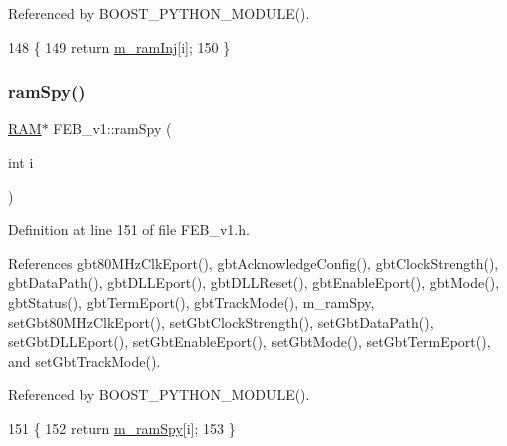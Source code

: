 Referenced by B\+O\+O\+S\+T\+\_\+\+P\+Y\+T\+H\+O\+N\+\_\+\+M\+O\+D\+U\+L\+E().


\begin{DoxyCode}
148                      \{
149     \textcolor{keywordflow}{return} \hyperlink{classFEB__v1_a3a3d06225c94c88d4cc5da7a6bde3867}{m\_ramInj}[i];
150   \}
\end{DoxyCode}
\mbox{\label{classFEB__v1_ac59216f094007ede67d49bd23287be73}} 
\subsubsection{\texorpdfstring{ram\+Spy()}{ramSpy()}}
{\footnotesize\ttfamily \hyperlink{classRAM}{R\+AM}$\ast$ F\+E\+B\+\_\+v1\+::ram\+Spy (\begin{DoxyParamCaption}\item[{int}]{i }\end{DoxyParamCaption})\hspace{0.3cm}{\ttfamily [inline]}}



Definition at line 151 of file F\+E\+B\+\_\+v1.\+h.



References gbt80\+M\+Hz\+Clk\+Eport(), gbt\+Acknowledge\+Config(), gbt\+Clock\+Strength(), gbt\+Data\+Path(), gbt\+D\+L\+L\+Eport(), gbt\+D\+L\+L\+Reset(), gbt\+Enable\+Eport(), gbt\+Mode(), gbt\+Status(), gbt\+Term\+Eport(), gbt\+Track\+Mode(), m\+\_\+ram\+Spy, set\+Gbt80\+M\+Hz\+Clk\+Eport(), set\+Gbt\+Clock\+Strength(), set\+Gbt\+Data\+Path(), set\+Gbt\+D\+L\+L\+Eport(), set\+Gbt\+Enable\+Eport(), set\+Gbt\+Mode(), set\+Gbt\+Term\+Eport(), and set\+Gbt\+Track\+Mode().



Referenced by B\+O\+O\+S\+T\+\_\+\+P\+Y\+T\+H\+O\+N\+\_\+\+M\+O\+D\+U\+L\+E().


\begin{DoxyCode}
151                      \{
152     \textcolor{keywordflow}{return} \hyperlink{classFEB__v1_ae6d8176c12bd60ad25ed81d535eb8c82}{m\_ramSpy}[i];
153   \}
\end{DoxyCode}
\mbox{\label{classFEB__v1_af945f99a912c5ad076ebdb03dbb6c139}} 
